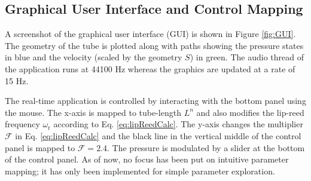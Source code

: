 \subsection{Graphical User Interface and Control Mapping}
A screenshot of the graphical user interface (GUI) is shown in Figure \ref{fig:GUI}. The geometry of the tube is plotted along with paths showing the pressure states in blue and the velocity (scaled by the geometry $S$) in green. The audio thread of the application runs at 44100 Hz whereas the graphics are updated at a rate of 15 Hz. 

The real-time application is controlled by interacting with the bottom panel using the mouse. The x-axis is mapped to tube-length $L^n$ and also modifies the lip-reed frequency $\omega_\text{r}$ according to Eq. \eqref{eq:lipReedCalc}. The y-axis changes the multiplier $\mathcal{F}$ in Eq. \eqref{eq:lipReedCalc} and the black line in the vertical middle of the control panel is mapped to $\mathcal{F} = 2.4$. The pressure is modulated by a slider at the bottom of the control panel. As of now, no focus has been put on intuitive parameter mapping; it has only been implemented for simple parameter exploration.

